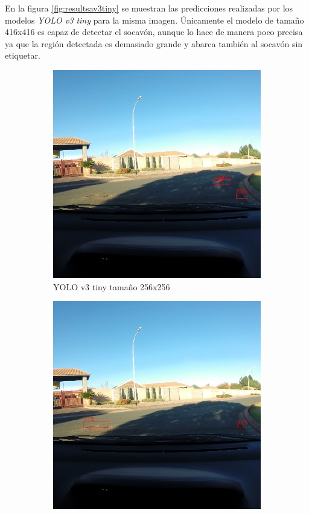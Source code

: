 En la figura \ref{fig:resultsav3tiny} se muestran las predicciones realizadas por los modelos \textit{YOLO v3 tiny} para la misma imagen. Únicamente el modelo de tamaño 416x416 es capaz de detectar el socavón, aunque lo hace de manera poco precisa ya que la región detectada es demasiado grande y abarca también al socavón sin etiquetar.

\begin{figure}[H]
	\centering
	\begin{subfigure}[h]{0.45\linewidth}
		\includegraphics[width=\linewidth]{images/results_a_yolo_v3_tiny_256.jpg}
		\caption{YOLO v3 tiny tamaño 256x256}
	\end{subfigure}
	\begin{subfigure}[h]{0.45\linewidth}
		\includegraphics[width=\linewidth]{images/results_a_yolo_v3_tiny_416.jpg}

\end{subfigure}
\end{figure}
